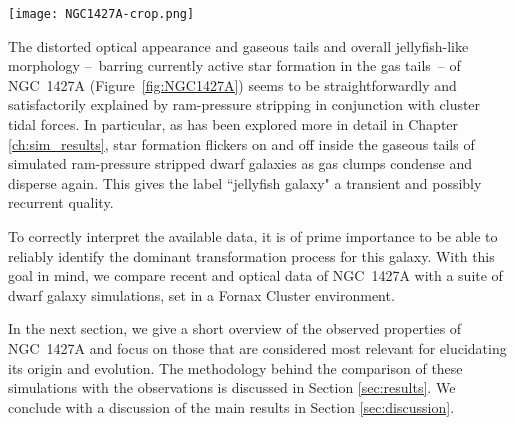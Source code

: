 \begin{figure*}
\centering
\texttt{[image: NGC1427A-crop.png]}
\caption{False-colour image of NGC 1427A, based on HST Advanced Camera for Surveys (ACS) archival data (Proposal ID: 9689; PI: M. Gregg).
The following colour bands were used: blue=475W; green=775W; red=625W+660N (stellar emission was subtracted from the 660N image using a scaled 775W image).
This colour scheme makes the H$\alpha$ emission stand out in red. An asinh stretch was applied to bring out also the faint details.
The inset zooms in on the Northern Clump, showing it to be composed of two loose stellar clusters with embedded \Hii{} emission.
The Northern Clump also appears to be connected to the north-west rim of NGC 1427A's main body via a tenuous stream of stars.
The directions of the \Hi{} tail and towards the Fornax Cluster center are indicated with arrows.
The dotted ellipse is the same as in Figures 1 and 2 of \citet{Lee-Waddell2018} and indicates the shape and direction of the faint outskirts of the galaxy, which are quite distinct from the system's inner, brighter parts.
}
\label{fig:NGC1427A}
\end{figure*}
The distorted optical appearance and gaseous tails and overall jellyfish-like morphology --~barring currently active star formation in the gas tails~-- of NGC~1427A (Figure~\ref{fig:NGC1427A}) seems to be straightforwardly and satisfactorily explained by ram-pressure stripping in conjunction with cluster tidal forces.
In particular, as has been explored more in detail in Chapter \ref{ch:sim_results}, star formation flickers on and off inside the gaseous tails of simulated ram-pressure stripped dwarf galaxies as gas clumps condense and disperse again.
This gives the label ``jellyfish galaxy" a transient and possibly recurrent quality.

To correctly interpret the available data, it is of prime importance to be able to reliably identify the dominant transformation process for this galaxy.
With this goal in mind, we compare recent \Hi{} and optical data of NGC~1427A with a suite of dwarf galaxy simulations, set in a Fornax Cluster environment.

In the next section, we give a short overview of the observed properties of NGC~1427A and focus on those that are considered most relevant for elucidating its origin and evolution.
The methodology behind the comparison of these simulations with the observations is discussed in Section \ref{sec:results}.
We conclude with a discussion of the main results in Section \ref{sec:discussion}.


